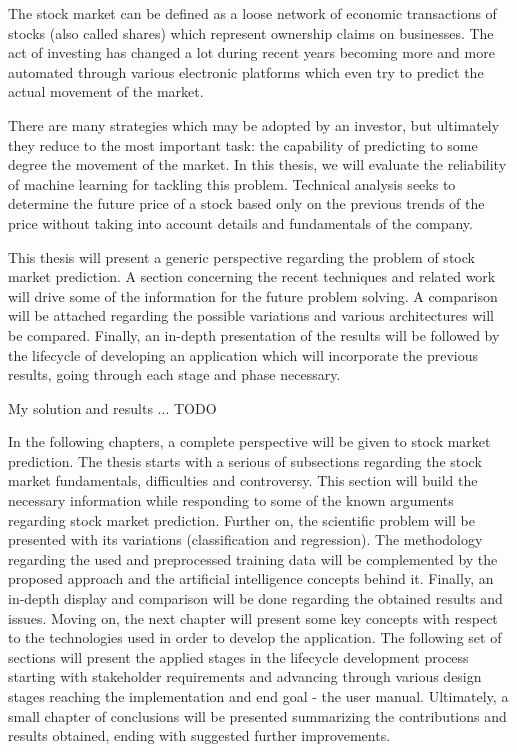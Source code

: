 The stock market can be defined as a loose network of economic transactions of stocks (also called shares) which represent ownership claims on businesses. The act of investing has changed a lot during recent years becoming more and more automated through various electronic platforms which even try to predict the actual movement of the market.

There are many strategies which may be adopted by an investor, but ultimately they reduce to the most important task: the capability of predicting to some degree the movement of the market. In this thesis, we will evaluate the reliability of machine learning for tackling this problem. Technical analysis seeks to determine the future price of a stock based only on the previous trends of the price without taking into account details and fundamentals of the company.

This thesis will present a generic perspective regarding the problem of stock market prediction. A section concerning the recent techniques and related work will drive some of the information for the future problem solving. A comparison will be attached regarding the possible variations and various architectures will be compared. Finally, an in-depth presentation of the results will be followed by the lifecycle of developing an application which will incorporate the previous results, going through each stage and phase necessary.

My solution and results ... TODO

In the following chapters, a complete perspective will be given to stock market prediction. The thesis starts with a serious of subsections regarding the stock market fundamentals, difficulties and controversy. This section will build the necessary information while responding to some of the known arguments regarding stock market prediction. Further on, the scientific problem will be presented with its variations (classification and regression). The methodology regarding the used and preprocessed training data will be complemented by the proposed approach and the artificial intelligence concepts behind it. Finally, an in-depth display and comparison will be done regarding the obtained results and issues. Moving on, the next chapter will present some key concepts with respect to the technologies used in order to develop the application. The following set of sections will present the applied stages in the lifecycle development process starting with stakeholder requirements and advancing through various design stages reaching the implementation and end goal - the user manual. Ultimately, a small chapter of conclusions will be presented summarizing the contributions and results obtained, ending with suggested further improvements.